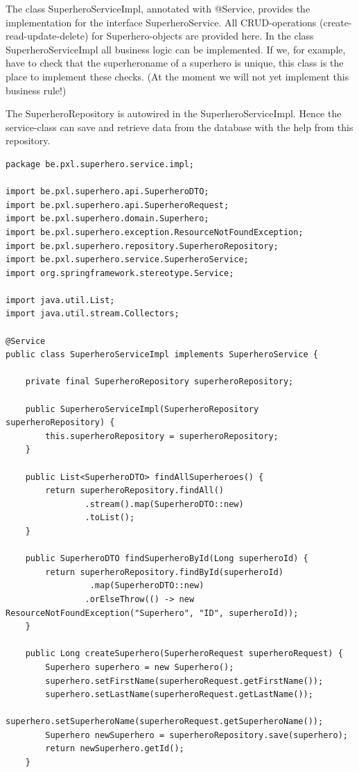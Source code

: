 \documentclass[a4paper, 12pt]{report}
\begin{document}
The class SuperheroServiceImpl, annotated with @Service, provides the implementation for the interface SuperheroService.
All CRUD-operations (create-read-update-delete) for Superhero-objects are provided here.
In the class SuperheroServiceImpl all business logic can be implemented.  If we, for example, have to check that the superheroname of a superhero is unique, this class is the place to implement these checks.  (At the moment we will not yet implement this business rule!)

The SuperheroRepository is autowired in the SuperheroServiceImpl. Hence the service-class can save and retrieve data from the database with the help from this repository. 


\begin{lstlisting}[frame=single]
package be.pxl.superhero.service.impl;

import be.pxl.superhero.api.SuperheroDTO;
import be.pxl.superhero.api.SuperheroRequest;
import be.pxl.superhero.domain.Superhero;
import be.pxl.superhero.exception.ResourceNotFoundException;
import be.pxl.superhero.repository.SuperheroRepository;
import be.pxl.superhero.service.SuperheroService;
import org.springframework.stereotype.Service;

import java.util.List;
import java.util.stream.Collectors;

@Service
public class SuperheroServiceImpl implements SuperheroService {

	private final SuperheroRepository superheroRepository;

	public SuperheroServiceImpl(SuperheroRepository superheroRepository) {
		this.superheroRepository = superheroRepository;
	}

	public List<SuperheroDTO> findAllSuperheroes() {
		return superheroRepository.findAll()
				.stream().map(SuperheroDTO::new)
				.toList();
	}

	public SuperheroDTO findSuperheroById(Long superheroId) {
		return superheroRepository.findById(superheroId)
		         .map(SuperheroDTO::new)
				.orElseThrow(() -> new ResourceNotFoundException("Superhero", "ID", superheroId));
	}

	public Long createSuperhero(SuperheroRequest superheroRequest) {
		Superhero superhero = new Superhero();
		superhero.setFirstName(superheroRequest.getFirstName());
		superhero.setLastName(superheroRequest.getLastName());
		superhero.setSuperheroName(superheroRequest.getSuperheroName());
		Superhero newSuperhero = superheroRepository.save(superhero);
		return newSuperhero.getId();
	}


\end{lstlisting}
\end{document}
